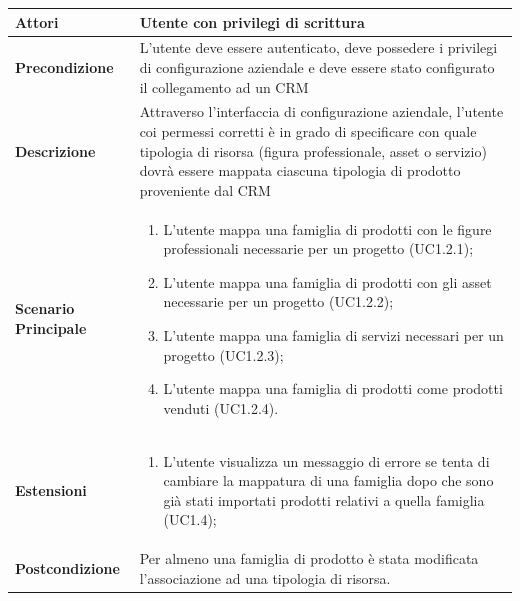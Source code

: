 	\begin{longtable}{ | p{2.7cm} | p{12cm} |}
		\hline \textbf{Attori} & Utente con privilegi di scrittura\\ 
		\hline \textbf{Precondizione} & L’utente deve essere autenticato, deve possedere i privilegi di configurazione aziendale e deve essere stato configurato il collegamento ad un CRM\\
		\hline \textbf{Descrizione} & Attraverso l’interfaccia di configurazione aziendale, l’utente coi permessi corretti è in grado di specificare con quale tipologia di risorsa (figura professionale, asset o servizio) dovrà essere mappata ciascuna tipologia di prodotto proveniente dal CRM\\ 
		\hline \textbf{Scenario Principale} & \begin{enumerate}
			\itemsep-0.5em 
			\item L’utente mappa una famiglia di prodotti con le figure professionali necessarie per un progetto  (UC1.2.1);
			\item L’utente mappa una famiglia di prodotti con gli asset necessarie per un progetto  (UC1.2.2);
			\item L’utente mappa una famiglia di servizi necessari per un progetto  (UC1.2.3);
			\item L’utente mappa una famiglia di prodotti come prodotti venduti (UC1.2.4).
			
		\end{enumerate}
		\\ 
		\hline \textbf{Estensioni} & \begin{enumerate}
			\item L’utente visualizza un messaggio di errore se tenta di cambiare la mappatura di una famiglia dopo che sono già stati importati prodotti relativi a quella famiglia  (UC1.4);
			
		\end{enumerate}
		\\ 
		\hline \textbf{Postcondizione} & Per almeno una famiglia di prodotto è stata modificata l’associazione ad una tipologia di risorsa. \\ 
		\hline 
	\end{longtable}
	
	\hypertarget{UC1.3}{}
